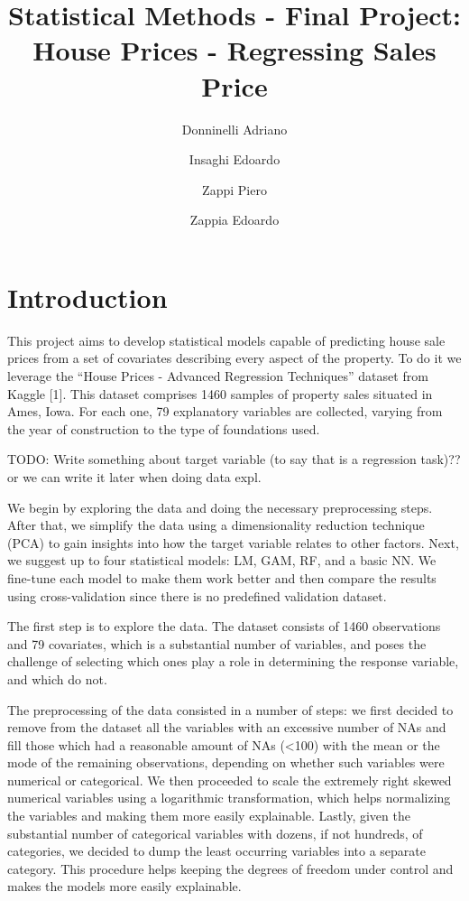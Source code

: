 \documentclass[
]{article}
\title{Statistical Methods - Final Project:\\
House Prices - Regressing Sales Price}
\author{Donninelli Adriano \and Insaghi Edoardo \and Zappi
Piero \and Zappia Edoardo}
\date{}
\begin{document}
\maketitle

\section{Introduction}\label{introduction}

This project aims to develop statistical models capable of predicting
house sale prices from a set of covariates describing every aspect of
the property. To do it we leverage the ``House Prices - Advanced
Regression Techniques'' dataset from Kaggle {[}1{]}. This dataset
comprises 1460 samples of property sales situated in Ames, Iowa. For
each one, 79 explanatory variables are collected, varying from the year
of construction to the type of foundations used.

TODO: Write something about target variable (to say that is a regression
task)?? or we can write it later when doing data expl.

We begin by exploring the data and doing the necessary preprocessing
steps. After that, we simplify the data using a dimensionality reduction
technique (PCA) to gain insights into how the target variable relates to
other factors. Next, we suggest up to four statistical models: LM, GAM,
RF, and a basic NN. We fine-tune each model to make them work better and
then compare the results using cross-validation since there is no
predefined validation dataset.

The first step is to explore the data. The dataset consists of 1460
observations and 79 covariates, which is a substantial number of
variables, and poses the challenge of selecting which ones play a role
in determining the response variable, and which do not.

The preprocessing of the data consisted in a number of steps: we first
decided to remove from the dataset all the variables with an excessive
number of NAs and fill those which had a reasonable amount of NAs
(\textless100) with the mean or the mode of the remaining observations,
depending on whether such variables were numerical or categorical. We
then proceeded to scale the extremely right skewed numerical variables
using a logarithmic transformation, which helps normalizing the
variables and making them more easily explainable. Lastly, given the
substantial number of categorical variables with dozens, if not
hundreds, of categories, we decided to dump the least occurring
variables into a separate category. This procedure helps keeping the
degrees of freedom under control and makes the models more easily
explainable.
\end{document}
